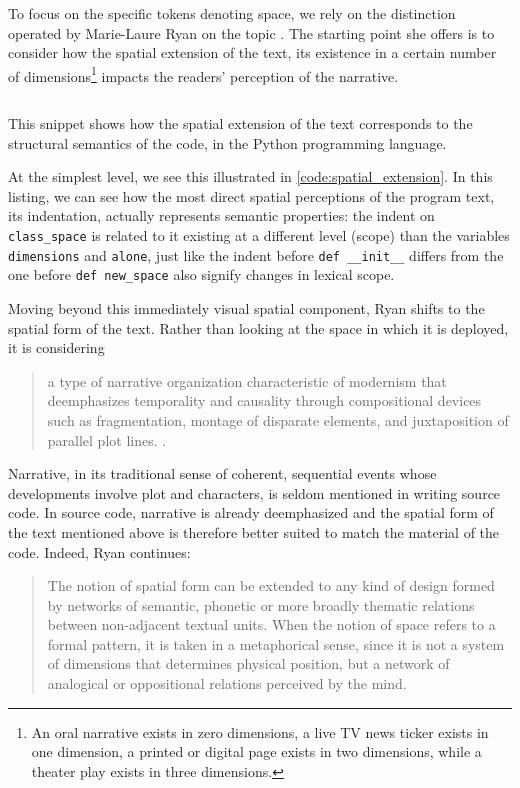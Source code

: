 To focus on the specific tokens denoting space, we rely on the distinction operated by Marie-Laure Ryan on the topic \citep{ryan_space_2009}. The starting point she offers is to consider how the spatial extension of the text, its existence in a certain number of dimensions\footnote{An oral narrative exists in zero dimensions, a live TV news ticker exists in one dimension, a printed or digital page exists in two dimensions, while a theater play exists in three dimensions.} impacts the readers' perception of the narrative.

\begin{listing}
    \inputminted[]{python}{./corpus/spatial_extension.py}
    \caption{This snippet shows how the spatial extension of the text corresponds to the structural semantics of the code, in the Python programming language.}
    \label{code:spatial_extension}
\end{listing}

At the simplest level, we see this illustrated in \ref{code:spatial_extension}. In this listing, we can see how the most direct spatial perceptions of the program text, its indentation, actually represents semantic properties: the indent on \lstinline{class_space} is related to it existing at a different level (scope) than the variables \lstinline{dimensions} and \lstinline{alone}, just like the indent before \lstinline{def __init__} differs from the one before \lstinline{def new_space} also signify changes in lexical scope.

Moving beyond this immediately visual spatial component, Ryan shifts to the spatial form of the text. Rather than looking at the space in which it is deployed, it is considering

\begin{quote}
    a type of narrative organization characteristic of modernism that deemphasizes temporality and causality through compositional devices such as fragmentation, montage of disparate elements, and juxtaposition of parallel plot lines. \citep{ryan_space_2009}.
\end{quote}

Narrative, in its traditional sense of coherent, sequential events whose developments involve plot and characters, is seldom mentioned in writing source code. In source code, narrative is already deemphasized and the spatial form of the text mentioned above is therefore better suited to match the material of the code. Indeed, Ryan continues:

\begin{quote}
    The notion of spatial form can be extended to any kind of design formed by networks of semantic, phonetic or more broadly thematic relations between non-adjacent textual units. When the notion of space refers to a formal pattern, it is taken in a metaphorical sense, since it is not a system of dimensions that determines physical position, but a network of analogical or oppositional relations perceived by the mind. \citep{ryan_space_2009}
\end{quote}

